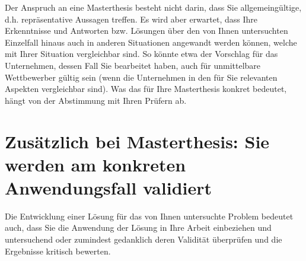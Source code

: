 Der Anspruch an eine Masterthesis besteht nicht darin, dass Sie allgemeingültige, d.h. repräsentative Aussagen treffen. Es wird aber erwartet, dass Ihre Erkenntnisse und Antworten bzw. Lösungen über den von Ihnen untersuchten Einzelfall hinaus auch in anderen Situationen angewandt werden können, welche mit Ihrer Situation vergleichbar sind. So könnte etwa der Vorschlag für das Unternehmen, dessen Fall Sie bearbeitet haben, auch für unmittelbare Wettbewerber gültig sein (wenn die Unternehmen in den für Sie relevanten Aspekten vergleichbar sind). Was das für Ihre Masterthesis konkret bedeutet, hängt von der Abstimmung mit Ihren Prüfern ab.

\section{Zusätzlich bei Masterthesis: Sie werden am konkreten Anwendungsfall validiert}
\label{sec:masterthesis-validierung}

Die Entwicklung einer Lösung für das von Ihnen untersuchte Problem bedeutet auch, dass Sie die Anwendung der Lösung in Ihre Arbeit einbeziehen und untersuchend oder zumindest gedanklich deren Validität überprüfen und die Ergebnisse kritisch bewerten.